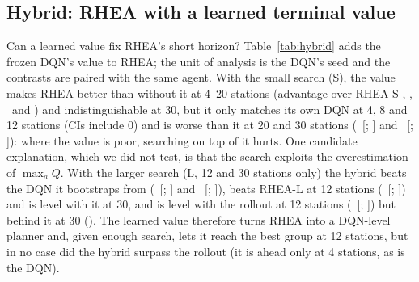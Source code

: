 \documentclass[conference,a4paper]{IEEEtran}
\begin{document}
\subsection{Hybrid: RHEA with a learned terminal value}
Can a learned value fix RHEA's short horizon? Table~\ref{tab:hybrid} adds the frozen DQN's value to RHEA; the unit of analysis is the DQN's seed and the contrasts are paired
with the same agent. With the small search (S), the value makes RHEA better than without it at 4--20 stations (advantage over RHEA-S \cecHybSVsRheaA, \cecHybSVsRheaB,
\cecHybSVsRheaC\ and \cecHybSVsRheaD) and indistinguishable at 30, but it only matches its own DQN at 4, 8 and 12 stations (CIs include 0) and is worse than it at 20 and 30
stations (\cecHybSDeltaD\ [\cecHybSLoD; \cecHybSHiD] and \cecHybSDeltaE\ [\cecHybSLoE; \cecHybSHiE]): where the value is poor, searching on top of it hurts. One candidate
explanation, which we did not test, is that the search exploits the overestimation of $\max_a Q$. With the larger search (L, 12 and 30 stations only) the hybrid beats the DQN
it bootstraps from (\cecHybLDeltaC\ [\cecHybLLoC; \cecHybLHiC] and \cecHybLDeltaE\ [\cecHybLLoE; \cecHybLHiE]), beats RHEA-L at 12 stations (\cecHybLVsRheaC\ [\cecHybLVsRheaLoC;
\cecHybLVsRheaHiC]) and is level with it at 30, and is level with the rollout at 12 stations (\cecHybLVsRollC\ [\cecHybLVsRollLoC; \cecHybLVsRollHiC]) but behind it at 30
(\cecHybLVsRollE). The learned value therefore turns RHEA into a DQN-level planner and, given enough search, lets it reach the best group at 12 stations, but in no case did the hybrid
surpass the rollout (it is ahead only at 4 stations, as is the DQN).

\begin{table}[t]
\centering\scriptsize\setlength{\tabcolsep}{3.5pt}
\caption{RHEA with the frozen DQN's value (S and L searches) against the DQN that supplies the value (same agents), RHEA without value and the rollout. Unmet demand per day on the
first \cecN\ test scenarios; mean$\pm$95\% CI over 5 DQN seeds. Contrasts (reward, positive favours the hybrid) with 95\% CIs over seeds: paired with the same DQN seed; against
RHEA (same search) and the rollout, which are single values.}
\label{tab:hybrid}

\end{table}
\end{document}
